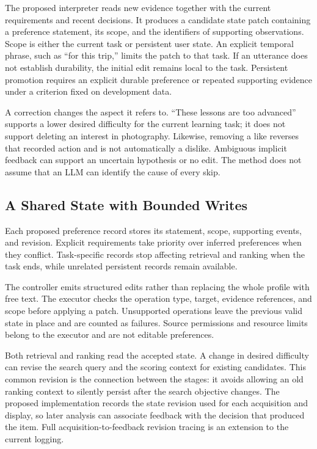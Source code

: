 \documentclass[11pt]{article}
\begin{document}
The proposed interpreter reads new evidence together with the current requirements and recent decisions. It produces a candidate state patch containing a preference statement, its scope, and the identifiers of supporting observations. Scope is either the current task or persistent user state. An explicit temporal phrase, such as ``for this trip,'' limits the patch to that task. If an utterance does not establish durability, the initial edit remains local to the task. Persistent promotion requires an explicit durable preference or repeated supporting evidence under a criterion fixed on development data.

A correction changes the aspect it refers to. ``These lessons are too advanced'' supports a lower desired difficulty for the current learning task; it does not support deleting an interest in photography. Likewise, removing a like reverses that recorded action and is not automatically a dislike. Ambiguous implicit feedback can support an uncertain hypothesis or no edit. The method does not assume that an LLM can identify the cause of every skip.

\subsection{A Shared State with Bounded Writes}

Each proposed preference record stores its statement, scope, supporting events, and revision. Explicit requirements take priority over inferred preferences when they conflict. Task-specific records stop affecting retrieval and ranking when the task ends, while unrelated persistent records remain available.

The controller emits structured edits rather than replacing the whole profile with free text. The executor checks the operation type, target, evidence references, and scope before applying a patch. Unsupported operations leave the previous valid state in place and are counted as failures. Source permissions and resource limits belong to the executor and are not editable preferences.

Both retrieval and ranking read the accepted state. A change in desired difficulty can revise the search query and the scoring context for existing candidates. This common revision is the connection between the stages: it avoids allowing an old ranking context to silently persist after the search objective changes. The proposed implementation records the state revision used for each acquisition and display, so later analysis can associate feedback with the decision that produced the item. Full acquisition-to-feedback revision tracing is an extension to the current logging.
\end{document}
